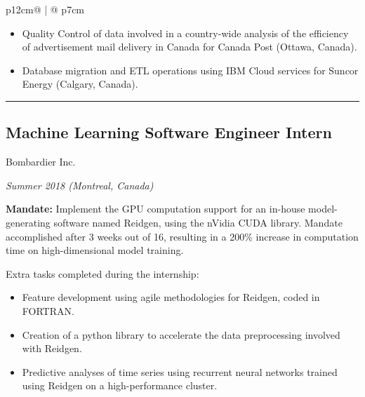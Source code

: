 \documentclass[letterpaper, 11pt]{article}
\begin{document}
\begin{tabular}{p{12cm}@{\hspace{1em}} | @{\hspace{1em}} p{7cm}}
\begin{adjustwidth}{1em}{1em}
                \begin{itemize}
                    \item Quality Control of data involved in a country-wide analysis of the efficiency of advertisement mail delivery in Canada for Canada Post (Ottawa, Canada).

                    \item Database migration and ETL operations using IBM Cloud services for Suncor Energy (Calgary, Canada).
                \end{itemize}
            \end{adjustwidth}

            \begin{adjustwidth}{4em}{4em}
                {\color{lightgray}\rule{\linewidth}{1pt}}           
            \end{adjustwidth}
        \subsection*{Machine Learning Software Engineer Intern}
            \hspace{1em} {\large Bombardier Inc.}
            
            \hspace{2em} \textit{Summer 2018 (Montreal, Canada)}
            \vspace{0.3em}
            \begin{adjustwidth}{1em}{1em}
                \textbf{Mandate:} Implement the GPU computation support for an in-house model-generating software named Reidgen, using the nVidia CUDA library. Mandate accomplished after 3 weeks out of 16, resulting in a 200\% increase in computation time on high-dimensional model training.
                \vspace{3pt}
            
                Extra tasks completed during the internship:
                \begin{itemize}
                    \item Feature development using agile methodologies for Reidgen, coded in FORTRAN.
                    \item Creation of a python library to accelerate the data preprocessing involved with Reidgen.
            
                    \item Predictive analyses of time series using recurrent neural networks trained using Reidgen on a high-performance cluster.
                \end{itemize}
           \end{adjustwidth}
        

\end{tabular}
\end{document}
